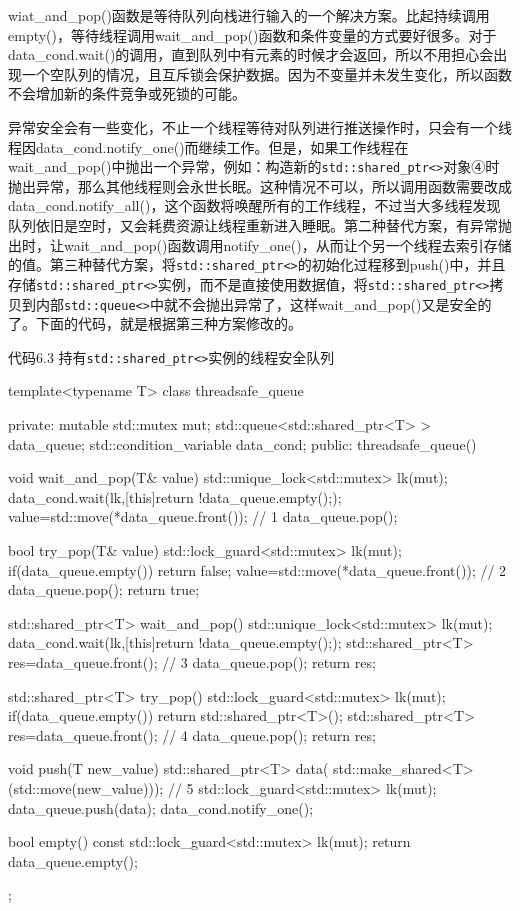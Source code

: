 wiat\_and\_pop()函数是等待队列向栈进行输入的一个解决方案。比起持续调用empty()，等待线程调用wait\_and\_pop()函数和条件变量的方式要好很多。对于data\_cond.wait()的调用，直到队列中有元素的时候才会返回，所以不用担心会出现一个空队列的情况，且互斥锁会保护数据。因为不变量并未发生变化，所以函数不会增加新的条件竞争或死锁的可能。

异常安全会有一些变化，不止一个线程等待对队列进行推送操作时，只会有一个线程因data\_cond.notify\_one()而继续工作。但是，如果工作线程在wait\_and\_pop()中抛出一个异常，例如：构造新的\texttt{std::shared\_ptr<>}对象④时抛出异常，那么其他线程则会永世长眠。这种情况不可以，所以调用函数需要改成data\_cond.notify\_all()，这个函数将唤醒所有的工作线程，不过当大多线程发现队列依旧是空时，又会耗费资源让线程重新进入睡眠。第二种替代方案，有异常抛出时，让wait\_and\_pop()函数调用notify\_one()，从而让个另一个线程去索引存储的值。第三种替代方案，将\texttt{std::shared\_ptr<>}的初始化过程移到push()中，并且存储\texttt{std::shared\_ptr<>}实例，而不是直接使用数据值，将\texttt{std::shared\_ptr<>}拷贝到内部\texttt{std::queue<>}中就不会抛出异常了，这样wait\_and\_pop()又是安全的了。下面的代码，就是根据第三种方案修改的。

代码6.3 持有\texttt{std::shared\_ptr<>}实例的线程安全队列

\begin{cpp}
template<typename T>
class threadsafe_queue
{
private:
  mutable std::mutex mut;
  std::queue<std::shared_ptr<T> > data_queue;
  std::condition_variable data_cond;
public:
  threadsafe_queue()
  {}

  void wait_and_pop(T& value)
  {
    std::unique_lock<std::mutex> lk(mut);
    data_cond.wait(lk,[this]{return !data_queue.empty();});
    value=std::move(*data_queue.front());  // 1
    data_queue.pop();
  }

  bool try_pop(T& value)
  {
    std::lock_guard<std::mutex> lk(mut);
    if(data_queue.empty())
      return false;
    value=std::move(*data_queue.front());  // 2
    data_queue.pop();
    return true;
  }

  std::shared_ptr<T> wait_and_pop()
  {
    std::unique_lock<std::mutex> lk(mut);
    data_cond.wait(lk,[this]{return !data_queue.empty();});
    std::shared_ptr<T> res=data_queue.front();  // 3
    data_queue.pop();
    return res;
  }

  std::shared_ptr<T> try_pop()
  {
    std::lock_guard<std::mutex> lk(mut);
    if(data_queue.empty())
      return std::shared_ptr<T>();
    std::shared_ptr<T> res=data_queue.front();  // 4
    data_queue.pop();
    return res;
  }

  void push(T new_value)
  {
    std::shared_ptr<T> data(
    std::make_shared<T>(std::move(new_value)));  // 5
    std::lock_guard<std::mutex> lk(mut);
    data_queue.push(data);
    data_cond.notify_one();
  }

  bool empty() const
  {
    std::lock_guard<std::mutex> lk(mut);
    return data_queue.empty();
  }
};
\end{cpp}

